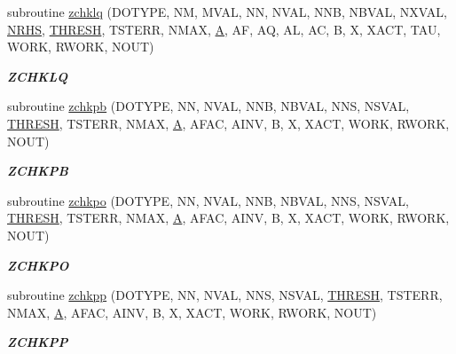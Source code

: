 \begin{DoxyCompactItemize}
subroutine \hyperlink{group__complex16__lin_ga05129173a9815715e39e9dd80336cf3b}{zchklq} (D\+O\+T\+Y\+P\+E, N\+M, M\+V\+A\+L, N\+N, N\+V\+A\+L, N\+N\+B, N\+B\+V\+A\+L, N\+X\+V\+A\+L, \hyperlink{example__user_8c_aa0138da002ce2a90360df2f521eb3198}{N\+R\+H\+S}, \hyperlink{zlaqgs_8c_a0656018abfc9fa2821827415f5d5ea57}{T\+H\+R\+E\+S\+H}, T\+S\+T\+E\+R\+R, N\+M\+A\+X, \hyperlink{classA}{A}, A\+F, A\+Q, A\+L, A\+C, B, X, X\+A\+C\+T, T\+A\+U, W\+O\+R\+K, R\+W\+O\+R\+K, N\+O\+U\+T)
\begin{DoxyCompactList}\small\item\em {\bfseries Z\+C\+H\+K\+L\+Q} \end{DoxyCompactList}\item 
subroutine \hyperlink{group__complex16__lin_gabc9605be049e363b85519b51345c57f5}{zchkpb} (D\+O\+T\+Y\+P\+E, N\+N, N\+V\+A\+L, N\+N\+B, N\+B\+V\+A\+L, N\+N\+S, N\+S\+V\+A\+L, \hyperlink{zlaqgs_8c_a0656018abfc9fa2821827415f5d5ea57}{T\+H\+R\+E\+S\+H}, T\+S\+T\+E\+R\+R, N\+M\+A\+X, \hyperlink{classA}{A}, A\+F\+A\+C, A\+I\+N\+V, B, X, X\+A\+C\+T, W\+O\+R\+K, R\+W\+O\+R\+K, N\+O\+U\+T)
\begin{DoxyCompactList}\small\item\em {\bfseries Z\+C\+H\+K\+P\+B} \end{DoxyCompactList}\item 
subroutine \hyperlink{group__complex16__lin_gae8e01bf74523a944db83a8866c39c3b7}{zchkpo} (D\+O\+T\+Y\+P\+E, N\+N, N\+V\+A\+L, N\+N\+B, N\+B\+V\+A\+L, N\+N\+S, N\+S\+V\+A\+L, \hyperlink{zlaqgs_8c_a0656018abfc9fa2821827415f5d5ea57}{T\+H\+R\+E\+S\+H}, T\+S\+T\+E\+R\+R, N\+M\+A\+X, \hyperlink{classA}{A}, A\+F\+A\+C, A\+I\+N\+V, B, X, X\+A\+C\+T, W\+O\+R\+K, R\+W\+O\+R\+K, N\+O\+U\+T)
\begin{DoxyCompactList}\small\item\em {\bfseries Z\+C\+H\+K\+P\+O} \end{DoxyCompactList}\item 
subroutine \hyperlink{group__complex16__lin_ga59e65f476416828198deda3ccd4c4495}{zchkpp} (D\+O\+T\+Y\+P\+E, N\+N, N\+V\+A\+L, N\+N\+S, N\+S\+V\+A\+L, \hyperlink{zlaqgs_8c_a0656018abfc9fa2821827415f5d5ea57}{T\+H\+R\+E\+S\+H}, T\+S\+T\+E\+R\+R, N\+M\+A\+X, \hyperlink{classA}{A}, A\+F\+A\+C, A\+I\+N\+V, B, X, X\+A\+C\+T, W\+O\+R\+K, R\+W\+O\+R\+K, N\+O\+U\+T)
\begin{DoxyCompactList}\small\item\em {\bfseries Z\+C\+H\+K\+P\+P} \end{DoxyCompactList}\item 

\end{DoxyCompactItemize}
